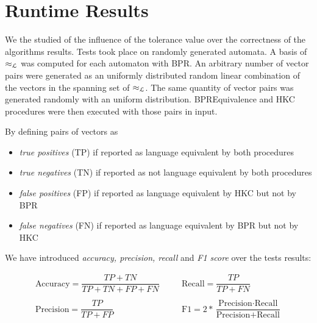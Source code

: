 \section{Runtime Results}


We the studied of the influence 
of the tolerance value over the correctness of the algorithms results.
Tests took place on randomly generated automata. A basis of  $\approx_{\mathcal{L}}$ was 
computed for each automaton with BPR. An arbitrary number of vector pairs were generated 
as an uniformly distributed random linear combination of the vectors in the spanning set of $\approx_{\mathcal{L}}$. 
The same quantity of vector pairs was generated randomly with an uniform distribution.
BPREquivalence and HKC procedures were then executed with those pairs in input.

By defining pairs of vectors as 

\begin{itemize}
    \item \textit{true positives} (TP) if reported as language equivalent by both 
    procedures
    \item \textit{true negatives} (TN) if reported as not language equivalent by both 
    procedures
    \item \textit{false positives} (FP) if reported as language equivalent by HKC but not by BPR
    \item \textit{false negatives} (FN) if reported as  language equivalent by BPR but not by HKC
\end{itemize}


We have introduced \textit{accuracy, precision, recall} and \textit{F1 score} over 
the tests results: 

\begin{equation*}
    \begin{aligned}
        \text{Accuracy} = \dfrac{TP + TN}{TP + TN + FP + FN} & \quad & 
        \text{Recall} = \dfrac{TP}{TP + FN} \\ && \\
        \text{Precision} = \dfrac{TP}{TP + FP} & \quad &
        \text{F1} = 2 * \dfrac{\text{Precision} \cdot \text{Recall}}{\text{Precision} + \text{Recall}}  \\ && \\
    \end{aligned}
\end{equation*}

